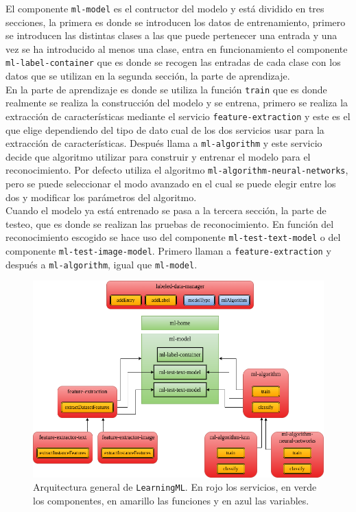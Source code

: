 \documentclass[a4paper, 12pt]{book}
\begin{document}
El componente \texttt{ml-model} es el contructor del modelo y está dividido en tres secciones, la primera es donde se introducen los datos de entrenamiento, primero se introducen las distintas clases a las que puede pertenecer una entrada y una vez se ha introducido al menos una clase, entra en funcionamiento el componente \texttt{ml-label-container} que es donde se recogen las entradas de cada clase con los datos que se utilizan en la segunda sección, la parte de aprendizaje. \\
En la parte de aprendizaje es donde se utiliza la función \texttt{train} que es donde realmente se realiza la construcción del modelo y se entrena, primero se realiza la extracción de características mediante el servicio \texttt{feature-extraction} y este es el que elige dependiendo del tipo de dato cual de los dos servicios usar para la extracción de características. Después llama a \texttt{ml-algorithm} y este servicio decide que algoritmo utilizar para construir y entrenar el modelo para el reconocimiento. Por defecto utiliza el algoritmo \texttt{ml-algorithm-neural-networks}, pero se puede seleccionar el modo avanzado en el cual se puede elegir entre los dos y modificar los parámetros del algoritmo.\\
Cuando el modelo ya está entrenado se pasa a la tercera sección, la parte de testeo, que es donde se realizan las pruebas de reconocimiento. En función del reconocimiento escogido se hace uso del componente \texttt{ml-test-text-model} o del componente \texttt{ml-test-image-model}. Primero llaman a \texttt{feature-extraction} y después a \texttt{ml-algorithm}, igual que \texttt{ml-model}.

\begin{figure}
	\centering
	\includegraphics[width=13cm, keepaspectratio]{img/arquitectura.png}
	\caption{Arquitectura general de \texttt{LearningML}. En rojo los servicios, en verde los componentes, en amarillo las funciones y en azul las variables.} \label{fig:arquitectura}
\end{figure}
\end{document}
